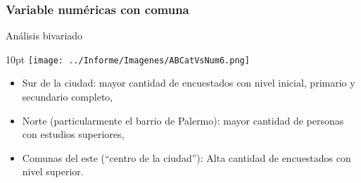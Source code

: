 \documentclass[pdf]{beamer}
\def\vspace{}%
\begin{document}
{    \subsubsection{Variable numéricas con comuna}
\begin{frame}{Análisis bivariado}
    \begin{minipage}{0.55\textwidth}
        \vspace{10pt}
        \texttt{[image: ../Informe/Imagenes/ABCatVsNum6.png]}
    \end{minipage}
    \begin{minipage}{0.4\textwidth}
        \begin{itemize}
            \vspace{4pt}
            \justifying%
            \item Sur de la ciudad: mayor cantidad de encuestados con nivel inicial, primario y secundario completo,
            \item Norte (particularmente el barrio de Palermo): mayor cantidad de personas con estudios superiores,
            \item Comunas del este (``centro de la ciudad''): Alta cantidad de encuestados con nivel superior.
        \end{itemize}
    \end{minipage}
\end{frame}    
    
}
\end{document}
